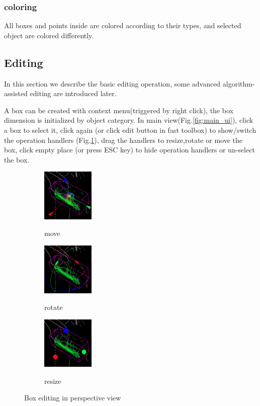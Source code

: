 \documentclass[letterpaper, 10 pt, conference]{ieeeconf}  %
\begin{document}
\subsubsection{coloring}
All boxes and points inside are colored according to their types, and selected object are colored differently.

\subsection{Editing}
In this section we describe the basic editing operation, some advanced algorithm-assisted editing are introduced later.


A box can be created with context menu(triggered by right click), the box dimension is initialized by object category. In main view(Fig.\ref{fig:main_ui}), click a box to select it, click again (or click edit button in fast toolbox) to show/switch the operation handlers (Fig.\ref{fig:box-mouse-edit}), drag the handlers to resize,rotate or move the box, click empty place (or press ESC key) to hide operation handlers or un-select the box.

\begin{figure}[thpb]
	\centering
	\begin{subfigure}{0.3\linewidth}
		\includegraphics[height=2.5cm]{./figures/box-move}\\
		\caption{move}
	\end{subfigure}
	\begin{subfigure}{0.3\linewidth}
		\includegraphics[height=2.5cm]{./figures/box-rotate}\\
		\caption{rotate}
	\end{subfigure}	
	\begin{subfigure}{0.3\linewidth}
		\includegraphics[height=2.5cm]{./figures/box-resize}\\
		\caption{resize}
	\end{subfigure}
	\caption{Box editing in perspective view}
	\label{fig:box-mouse-edit}
\end{figure}
\end{document}
